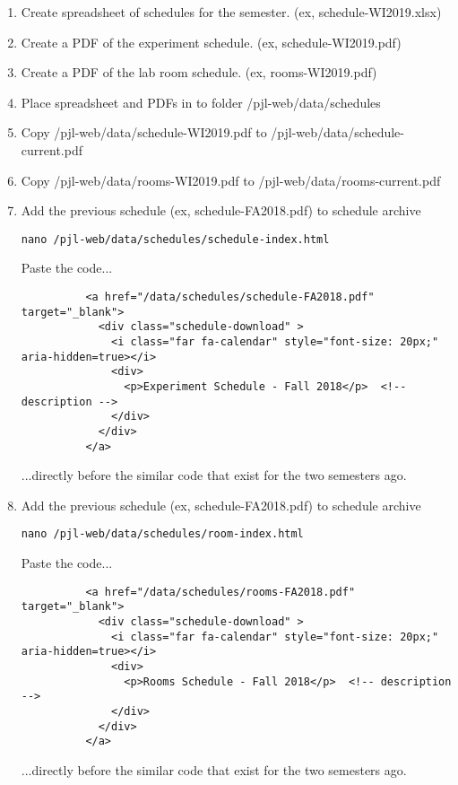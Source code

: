 \documentclass[justified]{book}
\begin{document}
\begin{enumerate}

\item Create spreadsheet of schedules for the semester. (ex, schedule-WI2019.xlsx)

\item Create a PDF of the experiment schedule. (ex, schedule-WI2019.pdf)

\item Create a PDF of the lab room schedule. (ex, rooms-WI2019.pdf)

\item Place spreadsheet and PDFs in to folder /pjl-web/data/schedules

\item Copy /pjl-web/data/schedule-WI2019.pdf to /pjl-web/data/schedule-current.pdf

\item Copy /pjl-web/data/rooms-WI2019.pdf to /pjl-web/data/rooms-current.pdf

\item Add the previous schedule (ex, schedule-FA2018.pdf) to schedule archive

\begin{lstlisting}
nano /pjl-web/data/schedules/schedule-index.html       
\end{lstlisting}

Paste the code...
\begin{lstlisting}
          <a href="/data/schedules/schedule-FA2018.pdf" target="_blank">
            <div class="schedule-download" >
              <i class="far fa-calendar" style="font-size: 20px;" aria-hidden=true></i> 
              <div>
                <p>Experiment Schedule - Fall 2018</p>  <!-- description -->
              </div>
            </div>
          </a>
\end{lstlisting}

...directly before the similar code that exist for the two semesters ago.

\item Add the previous schedule (ex, schedule-FA2018.pdf) to schedule archive

\begin{lstlisting}
nano /pjl-web/data/schedules/room-index.html       
\end{lstlisting}

Paste the code...
\begin{lstlisting}
          <a href="/data/schedules/rooms-FA2018.pdf" target="_blank">
            <div class="schedule-download" >
              <i class="far fa-calendar" style="font-size: 20px;" aria-hidden=true></i> 
              <div>
                <p>Rooms Schedule - Fall 2018</p>  <!-- description -->
              </div>
            </div>
          </a>
\end{lstlisting}

...directly before the similar code that exist for the two semesters ago.

\end{enumerate}
\end{document}

